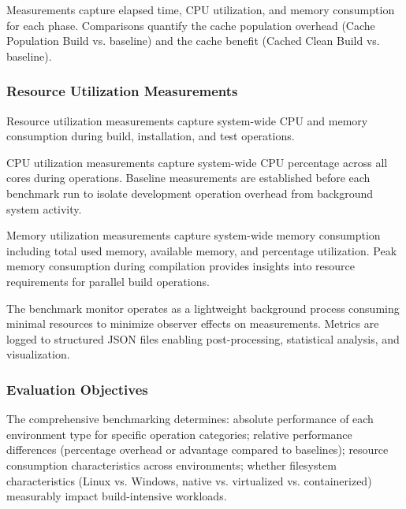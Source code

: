 Measurements capture elapsed time, CPU utilization, and memory consumption for each phase.
Comparisons quantify the cache population overhead (Cache Population Build vs. baseline) and the cache benefit (Cached Clean Build vs. baseline).

\subsubsection{Resource Utilization Measurements}

Resource utilization measurements capture system-wide CPU and memory consumption during build, installation, and test operations.

CPU utilization measurements capture system-wide CPU percentage across all cores during operations.
Baseline measurements are established before each benchmark run to isolate development operation overhead from background system activity.

Memory utilization measurements capture system-wide memory consumption including total used memory, available memory, and percentage utilization.
Peak memory consumption during compilation provides insights into resource requirements for parallel build operations.

The benchmark monitor operates as a lightweight background process consuming minimal resources to minimize observer effects on measurements.
Metrics are logged to structured JSON files enabling post-processing, statistical analysis, and visualization.

\subsubsection{Evaluation Objectives}

The comprehensive benchmarking determines: absolute performance of each environment type for specific operation categories; relative performance differences (percentage overhead or advantage compared to baselines); resource consumption characteristics across environments; whether filesystem characteristics (Linux vs. Windows, native vs. virtualized vs. containerized) measurably impact build-intensive workloads.



